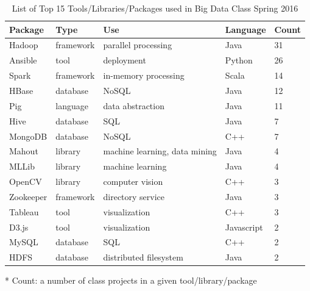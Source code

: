 \documentclass[9pt,twocolumn,twoside]{styles/osajnl}
\begin{document}
\begin{table}[htb]
\begin{center}
\begin{small}
\begin{threeparttable}
{\begin{tabular}{l|l|l|l|l}
    Package   & Type      & Use                           & Language   & Count\tnote{*} \\ \hline \hline
    Hadoop    & framework & parallel processing           & Java       & 31             \\ \hline
    Ansible   & tool      & deployment                    & Python     & 26             \\ \hline
    Spark     & framework & in-memory processing          & Scala      & 14             \\ \hline
    HBase     & database  & NoSQL                         & Java       & 12             \\ \hline
    Pig       & language  & data abstraction              & Java       & 11             \\ \hline
    Hive      & database  & SQL                           & Java       & 7              \\ \hline
    MongoDB   & database  & NoSQL                         & C++        & 7              \\ \hline
    Mahout    & library   & machine learning, data mining & Java       & 4              \\ \hline
    MLLib     & library   & machine learning              & Java       & 4              \\ \hline
    OpenCV    & library   & computer vision               & C++        & 3              \\ \hline
    Zookeeper & framework & directory service             & Java       & 3              \\ \hline
    Tableau   & tool      & visualization                 & C++        & 3              \\ \hline
    D3.js     & tool      & visualization                 & Javascript & 2              \\ \hline
    MySQL     & database  & SQL                           & C++        & 2              \\ \hline
    HDFS      & database  & distributed filesystem        & Java       & 2              \\ 

  \end{tabular}}
  \caption{List of Top 15 Tools/Libraries/Packages used in Big Data Class Spring 2016}
  \label{tab:tools-sp16}
  \begin{tablenotes}
  \item[*] Count: a number of class projects in a given tool/library/package
  \end{tablenotes}
  \end{threeparttable}
    \end{small}
  \end{center}
\end{table}
\end{document}
